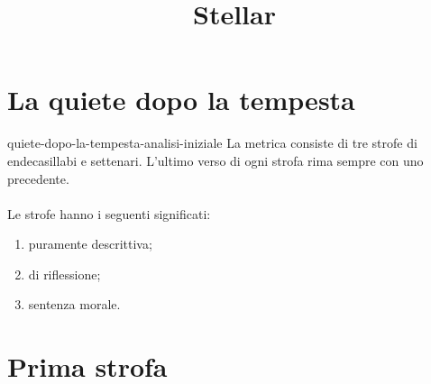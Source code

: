 \documentclass[preview]{standalone}
\begin{document}
\title{Stellar}
\genpage

\section{La quiete dopo la tempesta}


\begin{snippet}{quiete-dopo-la-tempesta-analisi-iniziale}
    La metrica consiste di tre strofe di endecasillabi e settenari.
    L'ultimo verso di ogni strofa rima sempre con uno precedente.
    \\\\
    Le strofe hanno i seguenti significati:
    \begin{enumerate}
        \item puramente descrittiva;
        \item di riflessione;
        \item sentenza morale.
    \end{enumerate}
\end{snippet}

\section{Prima strofa}
\end{document}
